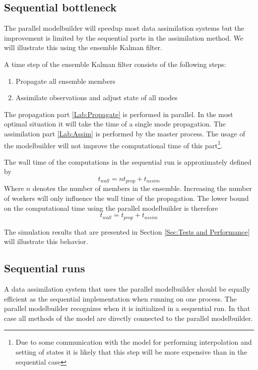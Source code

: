 \documentclass[a4paper,12pt]{article}
\begin{document}
\subsection{Sequential bottleneck}
The parallel modelbuilder will speedup most data assimilation systems but
the improvement is limited by the sequential parts in the assimilation
method. We will illustrate this using the ensemble Kalman filter. 

A time step of the ensemble Kalman filter consists of the following steps:
\begin{enumerate}
\item \label{Lab:Propagate} Propagate all ensemble members
\item \label{Lab:Assim} Assimilate observations and adjust state of all modes
\end{enumerate}

The propagation part \ref{Lab:Propagate} is performed in parallel. In the
most optimal situation it will take the time of a single mode propagation.
The assimilation part \ref{Lab:Assim} is performed by the master process.
The usage of the modelbuilder will not improve the computational time of
this part\footnote{Due to some communication with the model for performing
interpolation and setting of states it is likely that this step will be
more expensive than in the sequential case}.

The wall time of the computations in the sequential run is approximately
defined by
\begin{equation}
t_{wall}=n t_{prop} + t_{assim}
\end{equation}
Where $n$ denotes the number of members in the ensemble. Increasing the
number of workers will only influence the wall time of the propagation. The
lower bound on the computational time using the parallel modelbuilder is
therefore
\begin{equation}
t_{wall}=t_{prop} + t_{assim}
\end{equation}

The simulation results that are presented in Section \ref{Sec:Tests and
Performance} will illustrate this behavior.

\subsection{Sequential runs}
A data assimilation system that uses the parallel modelbuilder should be
equally efficient as the sequential implementation when running on one
process. The parallel modelbuilder recognizes when it is initialized in a
sequential run. In that case all methods of the model are directly
connected to the parallel modelbuilder.
\end{document}
